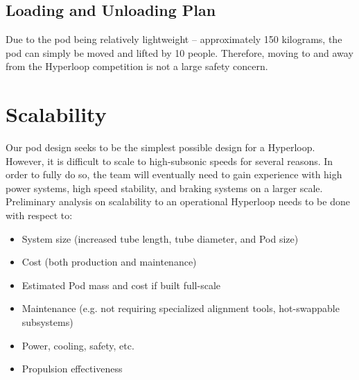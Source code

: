 \documentclass[main.tex]{subfiles}
\begin{document}
\begin{flushleft}
\subsection{Loading and Unloading Plan}
Due to the pod being relatively lightweight – approximately 150 kilograms, the pod can simply be moved and lifted by 10 people. Therefore, moving to and away from the Hyperloop competition is not a large safety concern.

\section{Scalability}
Our pod design seeks to be the simplest possible design for a Hyperloop. However, it is difficult to scale to high-subsonic speeds for several reasons.
In order to fully do so, the team will eventually need to gain experience with high power systems, high speed stability, and braking systems on a larger scale.\\

Preliminary analysis on scalability to an operational Hyperloop needs to be done with respect to:
\begin{itemize}
    \item System size (increased tube length, tube diameter, and Pod size)
    \item Cost (both production and maintenance)
    \item Estimated Pod mass and cost if built full-scale
    \item Maintenance (e.g. not requiring specialized alignment tools, hot-swappable subsystems)
    \item Power, cooling, safety, etc.
    \item Propulsion effectiveness
\end{itemize}
\end{flushleft}
\end{document}
